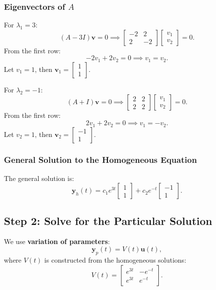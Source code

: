 \documentclass[12pt]{article}
\begin{document}
\subsubsection*{Eigenvectors of \(A\)}
For \( \lambda_1 = 3 \):
\[
(A - 3I)\mathbf{v} = 0 \implies \begin{bmatrix} -2 & 2 \\ 2 & -2 \end{bmatrix}\begin{bmatrix} v_1 \\ v_2 \end{bmatrix} = 0.
\]
From the first row:
\[
-2v_1 + 2v_2 = 0 \implies v_1 = v_2.
\]
Let \( v_1 = 1 \), then \( \mathbf{v}_1 = \begin{bmatrix} 1 \\ 1 \end{bmatrix} \).

For \( \lambda_2 = -1 \):
\[
(A + I)\mathbf{v} = 0 \implies \begin{bmatrix} 2 & 2 \\ 2 & 2 \end{bmatrix}\begin{bmatrix} v_1 \\ v_2 \end{bmatrix} = 0.
\]
From the first row:
\[
2v_1 + 2v_2 = 0 \implies v_1 = -v_2.
\]
Let \( v_2 = 1 \), then \( \mathbf{v}_2 = \begin{bmatrix} -1 \\ 1 \end{bmatrix} \).

\subsubsection*{General Solution to the Homogeneous Equation}
The general solution is:
\[
\mathbf{y}_h(t) = c_1e^{3t}\begin{bmatrix} 1 \\ 1 \end{bmatrix} + c_2e^{-t}\begin{bmatrix} -1 \\ 1 \end{bmatrix}.
\]

\subsection*{Step 2: Solve for the Particular Solution}
We use \textbf{variation of parameters}:
\[
\mathbf{y}_p(t) = V(t)\mathbf{u}(t),
\]
where \( V(t) \) is constructed from the homogeneous solutions:
\[
V(t) = \begin{bmatrix} e^{3t} & -e^{-t} \\ e^{3t} & e^{-t} \end{bmatrix}.
\]
\end{document}
